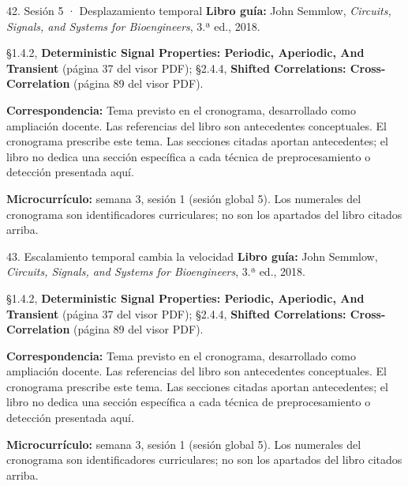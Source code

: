 \documentclass[
  10pt,
  ignorenonframetext,
  aspectratio=169,
  spanish,
]{beamer}
\begin{document}
\begin{frame}{42. Sesión 5 · Desplazamiento temporal}
\label{sesiuxf3n-5-desplazamiento-temporal}
\textbf{Libro guía:} John Semmlow, \emph{Circuits, Signals, and Systems
for Bioengineers}, 3.ª ed., 2018.

§1.4.2, \textbf{Deterministic Signal Properties: Periodic, Aperiodic,
And Transient} (página 37 del visor PDF); §2.4.4, \textbf{Shifted
Correlations: Cross-Correlation} (página 89 del visor PDF).

\textbf{Correspondencia:} Tema previsto en el cronograma, desarrollado
como ampliación docente. Las referencias del libro son antecedentes
conceptuales. El cronograma prescribe este tema. Las secciones citadas
aportan antecedentes; el libro no dedica una sección específica a cada
técnica de preprocesamiento o detección presentada aquí.

\textbf{Microcurrículo:} semana 3, sesión 1 (sesión global 5). Los
numerales del cronograma son identificadores curriculares; no son los
apartados del libro citados arriba.
\end{frame}

\begin{frame}{43. Escalamiento temporal cambia la velocidad}
\label{escalamiento-temporal-cambia-la-velocidad}
\textbf{Libro guía:} John Semmlow, \emph{Circuits, Signals, and Systems
for Bioengineers}, 3.ª ed., 2018.

§1.4.2, \textbf{Deterministic Signal Properties: Periodic, Aperiodic,
And Transient} (página 37 del visor PDF); §2.4.4, \textbf{Shifted
Correlations: Cross-Correlation} (página 89 del visor PDF).

\textbf{Correspondencia:} Tema previsto en el cronograma, desarrollado
como ampliación docente. Las referencias del libro son antecedentes
conceptuales. El cronograma prescribe este tema. Las secciones citadas
aportan antecedentes; el libro no dedica una sección específica a cada
técnica de preprocesamiento o detección presentada aquí.

\textbf{Microcurrículo:} semana 3, sesión 1 (sesión global 5). Los
numerales del cronograma son identificadores curriculares; no son los
apartados del libro citados arriba.
\end{frame}
\end{document}
